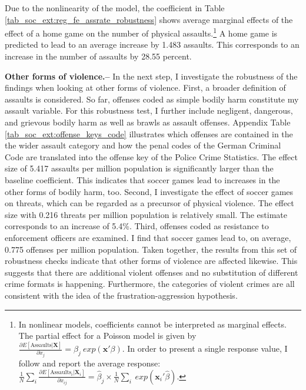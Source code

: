 \documentclass[11pt, a4paper]{article} %
\begin{document}
Due to the nonlinearity of the model, the coefficient in Table \ref{tab_soc_ext:reg_fe_assrate_robustness} shows average marginal effects of the effect of a home game on the number of physical assaults.\footnote{In nonlinear models, coefficients cannot be interpreted as marginal effects. The partial effect for a Poisson model is given by $\frac{\partial E\left[ \text{Assaults}| \mathbf{X}\right]}{\partial x_j} = \beta_j\ exp(\mathbf{x'}\beta)$. In order to present a single response value, I follow \cite{cameron2005microeconometrics} and report the average response: $\frac{1}{N}\sum_i \frac{\partial E\left[ \text{Assaults}_i| \mathbf{X}_i\right]}{\partial x_{ij}} = \hat\beta_j \times \frac{1}{N} \sum_i\ exp(\mathbf{x}_i'\hat\beta)$.} A home game is predicted to lead to an average increase by 1.483 assaults. This corresponds to an increase in the number of assaults by 28.55 percent. \newline

 
\textbf{Other forms of violence.--} In the next step, I investigate the robustness of the findings when looking at other forms of violence. First, a broader definition of assaults is considered. So far, offenses coded as simple bodily harm constitute my assault variable. For this robustness test, I further include negligent, dangerous, and grievous bodily harm as well as brawls as assault offenses. Appendix Table \ref{tab_soc_ext:offense_keys_code} illustrates which offenses are contained in the the wider assault category and how the penal codes of the German Criminal Code are translated into the offense key of the Police Crime Statistics. The effect size of 5.417 assaults per million population is significantly larger than the baseline coefficient. This indicates that soccer games lead to increases in the other forms of bodily harm, too. Second, I investigate the effect of soccer games on threats, which can be regarded as a precursor of physical violence. The effect size with 0.216 threats per million population is relatively small. The estimate corresponds to an increase of 5.4\%. Third, offenses coded as resistance to enforcement officers are examined. I find that soccer games lead to, on average, 0.775 offenses per million population. Taken together, the results from this set of robustness checks indicate that other forms of violence are affected likewise. This suggests that there are additional violent offenses and no substitution of different crime formats is happening. Furthermore, the categories of violent crimes are all consistent with the idea of the frustration-aggression hypothesis.\newline
 
\end{document}
